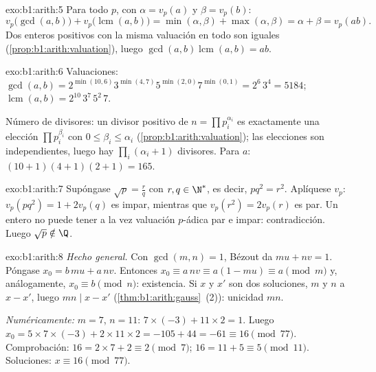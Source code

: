 \begin{solution}{exo:b1:arith:5}
Para todo  $p$, con $\alpha = v_p(a)$ y $\beta = v_p(b)$:
\[
v_p\bigl(\gcd(a,b)\bigr) + v_p\bigl(\operatorname{lcm}(a,b)\bigr)
= \min(\alpha, \beta) + \max(\alpha, \beta)
= \alpha + \beta = v_p(ab) .
\]
Dos enteros positivos con la misma valuación en todo  son
iguales (\cref{prop:b1:arith:valuation}), luego
$\gcd(a,b)\operatorname{lcm}(a,b) = ab$.
\end{solution}

\begin{solution}{exo:b1:arith:6}
Valuaciones: $\gcd(a, b) = 2^{\min(10,6)} 3^{\min(4,7)} 5^{\min(2,0)}
7^{\min(0,1)} = 2^6\, 3^4 = 5184$;
$\operatorname{lcm}(a,b) = 2^{10}\, 3^7\, 5^2\, 7$.

Número de divisores: un divisor positivo de $n = \prod p_i^{\alpha_i}$
es exactamente una elección $\prod p_i^{\beta_i}$ con
$0 \leq \beta_i \leq \alpha_i$ (\cref{prop:b1:arith:valuation}); las
elecciones son independientes, luego hay $\prod_i (\alpha_i + 1)$
divisores. Para $a$: $(10+1)(4+1)(2+1) = 165$.
\end{solution}

\begin{solution}{exo:b1:arith:7}
Supóngase $\sqrt p = \frac rq$ con $r, q \in \N^*$, es decir,
$p q^2 = r^2$. Aplíquese $v_p$: $v_p(pq^2) = 1 + 2v_p(q)$ es impar,
mientras que $v_p(r^2) = 2 v_p(r)$ es par. Un entero no puede tener a
la vez valuación $p$-ádica par e impar: contradicción. Luego
$\sqrt p \notin \Q$.
\end{solution}

\begin{solution}{exo:b1:arith:8}
\emph{Hecho general.} Con $\gcd(m,n) = 1$, Bézout da $mu + nv = 1$.
Póngase $x_0 = b\,mu + a\,nv$. Entonces $x_0 \equiv a\,nv \equiv
a(1 - mu) \equiv a \pmod m$ y, análogamente, $x_0 \equiv b \pmod n$:
existencia. Si $x$ y $x'$ son dos soluciones, $m$ y $n$  a
$x - x'$, luego $mn \mid x - x'$ (\cref{thm:b1:arith:gauss}~(2)):
unicidad  $mn$.

\emph{Numéricamente:} $m = 7$, $n = 11$: $7 \times (-3) + 11 \times 2 =
1$. Luego $x_0 = 5 \times 7 \times (-3) + 2 \times 11 \times 2 = -105 +
44 = -61 \equiv 16 \pmod{77}$. Comprobación: $16 = 2\times 7 + 2
\equiv 2 \pmod 7$; $16 = 11 + 5 \equiv 5 \pmod{11}$. Soluciones:
$x \equiv 16 \pmod{77}$.
\end{solution}

